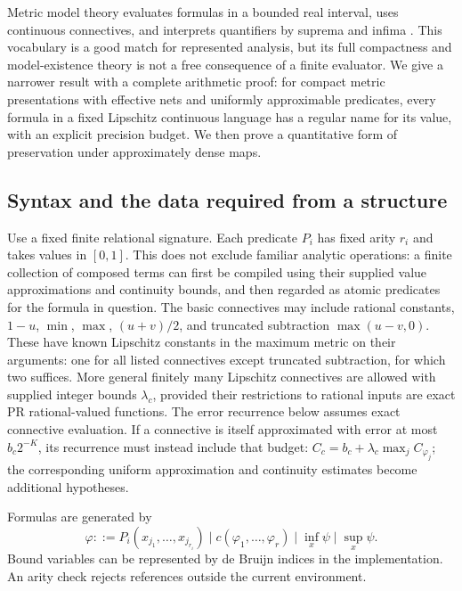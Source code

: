 Metric model theory evaluates formulas in a bounded real interval, uses
continuous connectives, and interprets quantifiers by suprema and infima
\cite{metric-model-theory}. This vocabulary is a good match for represented
analysis, but its full compactness and model-existence theory is not a free
consequence of a finite evaluator. We give a narrower result with a complete
arithmetic proof: for compact metric presentations with effective nets and
uniformly approximable predicates, every formula in a fixed Lipschitz
continuous language has a regular name for its value, with an explicit
precision budget. We then prove a quantitative form of preservation under
approximately dense maps.

\subsection{Syntax and the data required from a structure}

Use a fixed finite relational signature. Each predicate $P_i$ has fixed
arity $r_i$ and takes values in $[0,1]$. This does not exclude familiar
analytic operations: a finite collection of composed terms can first be
compiled using their supplied value approximations and continuity bounds,
and then regarded as atomic predicates for the formula in question.
The basic connectives may include rational constants, $1-u$, $\min$, $\max$,
$(u+v)/2$, and truncated subtraction $\max(u-v,0)$. These have known
Lipschitz constants in the maximum metric on their arguments: one for all
listed connectives except truncated subtraction, for which two suffices.
More general finitely many Lipschitz connectives are allowed with supplied
integer bounds $\lambda_c$, provided their restrictions to rational inputs
are exact PR rational-valued functions. The error recurrence below assumes
exact connective evaluation. If a connective is itself approximated with
error at most $b_c2^{-K}$, its recurrence must instead include that budget:
$C_c=b_c+\lambda_c\max_j C_{\varphi_j}$; the corresponding uniform
approximation and continuity estimates become additional hypotheses.

Formulas are generated by
\[
 \varphi ::= P_i(x_{j_1},\ldots,x_{j_{r_i}})
 \mid c(\varphi_1,\ldots,\varphi_r)
 \mid \inf_x\psi\mid\sup_x\psi.
\]
Bound variables can be represented by de Bruijn indices in the implementation.
An arity check rejects references outside the current environment.

